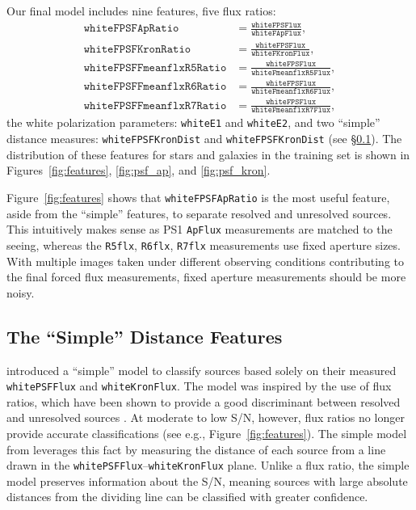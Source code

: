 \documentclass[twocolumn]{aastex63}
\begin{document}
Our final model includes nine features, five flux ratios:
%
\begin{align*}
    \mathtt{whiteFPSFApRatio} &= \frac{\mathtt{whiteFPSFlux}}{\mathtt{whiteFApFlux}},\\
    \mathtt{whiteFPSFKronRatio} &= \frac{\mathtt{whiteFPSFlux}}{\mathtt{whiteFKronFlux}},\\
    \mathtt{whiteFPSFFmeanflxR5Ratio} &= \frac{\mathtt{whiteFPSFlux}}{\mathtt{whiteFmeanflxR5Flux}},\\
    \mathtt{whiteFPSFFmeanflxR6Ratio} &= \frac{\mathtt{whiteFPSFlux}}{\mathtt{whiteFmeanflxR6Flux}},\\
    \mathtt{whiteFPSFFmeanflxR7Ratio} &= \frac{\mathtt{whiteFPSFlux}}{\mathtt{whiteFmeanflxR7Flux}},
\end{align*}
%
the white polarization parameters: \texttt{whiteE1} and \texttt{whiteE2}, and
two ``simple'' distance measures: \texttt{whiteFPSFKronDist} and
\texttt{whiteFPSFKronDist} (see \S\ref{sec:simple_model}). The distribution of
these features for stars and galaxies in the training set is shown in
Figures~\ref{fig:features}, \ref{fig:psf_ap}, and \ref{fig:psf_kron}.

Figure~\ref{fig:features} shows that \texttt{whiteFPSFApRatio} is the most
useful feature, aside from the ``simple'' features, to separate resolved and
unresolved sources. This intuitively makes sense as PS1 \texttt{ApFlux}
measurements are matched to the seeing, whereas the \texttt{R5flx},
\texttt{R6flx}, \texttt{R7flx} measurements use fixed aperture sizes. With
multiple images taken under different observing conditions contributing to the
final forced flux measurements, fixed aperture measurements should be more
noisy.

\subsection{The ``Simple'' Distance Features}\label{sec:simple_model}

\citet{Tachibana18} introduced a ``simple'' model to classify sources based
solely on their measured \texttt{whitePSFFlux} and \texttt{whiteKronFlux}. The
model was inspired by the use of flux ratios, which have been shown to provide
a good discriminant between resolved and unresolved sources \citep[e.g., the
SDSS morphological \texttt{CLASS} parameter;][]{Lupton01}. At moderate to low
S/N, however, flux ratios no longer provide accurate classifications (see
e.g., Figure~\ref{fig:features}). The simple model from \citet{Tachibana18}
leverages this fact by measuring the distance of each source from a line drawn
in the \texttt{whitePSFFlux}--\texttt{whiteKronFlux} plane. Unlike a flux
ratio, the simple model preserves information about the S/N, meaning sources
with large absolute distances from the dividing line can be classified with
greater confidence.
\end{document}
